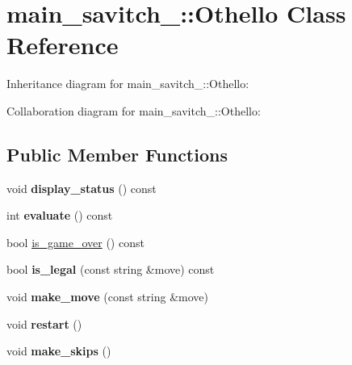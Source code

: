 \hypertarget{classmain__savitch__14_1_1Othello}{}\section{main\+\_\+savitch\+\_\+:\+:Othello Class Reference}
\label{classmain__savitch__14_1_1Othello}


Inheritance diagram for main\+\_\+savitch\+\_\+:\+:Othello\+:


Collaboration diagram for main\+\_\+savitch\+\_\+:\+:Othello\+:
\subsection*{Public Member Functions}
\begin{DoxyCompactItemize}
\item 
void {\bfseries display\+\_\+status} () const \hypertarget{classmain__savitch__14_1_1Othello_a471f0e8f0e63ed32d764682f60110267}{}\label{classmain__savitch__14_1_1Othello_a471f0e8f0e63ed32d764682f60110267}

\item 
int {\bfseries evaluate} () const \hypertarget{classmain__savitch__14_1_1Othello_a1b3239a14882cbc7e7bd44c0b6828514}{}\label{classmain__savitch__14_1_1Othello_a1b3239a14882cbc7e7bd44c0b6828514}

\item 
bool \hyperlink{classmain__savitch__14_1_1Othello_a4387d20f953aab54025760ec3f72f7ca}{is\+\_\+game\+\_\+over} () const 
\item 
bool {\bfseries is\+\_\+legal} (const string \&move) const \hypertarget{classmain__savitch__14_1_1Othello_ab4fb0040d5e1dbe34c33fa11a82285cf}{}\label{classmain__savitch__14_1_1Othello_ab4fb0040d5e1dbe34c33fa11a82285cf}

\item 
void {\bfseries make\+\_\+move} (const string \&move)\hypertarget{classmain__savitch__14_1_1Othello_a1066b280efa5cb41039585669282fe06}{}\label{classmain__savitch__14_1_1Othello_a1066b280efa5cb41039585669282fe06}

\item 
void {\bfseries restart} ()\hypertarget{classmain__savitch__14_1_1Othello_abf872b8074bfa4c04119317dc3b39af2}{}\label{classmain__savitch__14_1_1Othello_abf872b8074bfa4c04119317dc3b39af2}

\item 
void {\bfseries make\+\_\+skips} ()\hypertarget{classmain__savitch__14_1_1Othello_a3177234195a490eef52343d957e64b5d}{}\label{classmain__savitch__14_1_1Othello_a3177234195a490eef52343d957e64b5d}


\end{DoxyCompactItemize}
